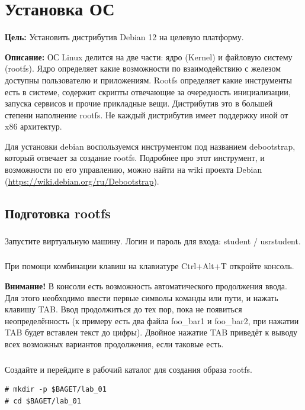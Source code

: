 \chapter{Установка ОС}
\textbf{Цель:} Установить дистрибутив Debian 12 на целевую платформу.

\vspace{5mm}
\textbf{Описание:} ОС Linux делится на две части: ядро (Kernel) и файловую систему (rootfs). Ядро определяет какие возможности по взаимодействию с железом доступны пользователю и приложениям. Rootfs определяет какие инструменты есть в системе, содержит скрипты отвечающие за очередность инициализации, запуска сервисов и прочие прикладные вещи. Дистрибутив это в большей степени наполнение rootfs. Не каждый дистрибутив имеет поддержку иной от x86 архитектур.

Для установки debian воспользуемся инструментом под названием debootstrap, который отвечает за создание rootfs. Подробнее про этот инструмент, и возможности по его управлению, можно найти на wiki проекта Debian (\href{https://wiki.debian.org/ru/Debootstrap}{https://wiki.debian.org/ru/Debootstrap}).


\section{Подготовка rootfs}

\subsection{} Запустите виртуальную машину. Логин и пароль для входа: student / usrstudent.

\subsection{} При помощи комбинации клавиш на клавиатуре Ctrl+Alt+T откройте консоль.

\vspace{5mm}
\textbf{Внимание!} В консоли есть возможность автоматического продолжения ввода. Для этого необходимо ввести первые символы команды или пути, и нажать клавишу TAB. Ввод продолжиться до тех пор, пока не появиться неопределённость (к примеру есть два файла foo\_bar1 и foo\_bar2, при нажатии TAB будет вставлен текст до цифры). Двойное нажатие TAB приведёт к выводу всех возможных вариантов продолжения, если таковые есть.

\subsection{} Создайте и перейдите в рабочий каталог для создания образа rootfs.
\begin{lstlisting}[style=bash]
# mkdir -p $BAGET/lab_01
# cd $BAGET/lab_01 
\end{lstlisting}

